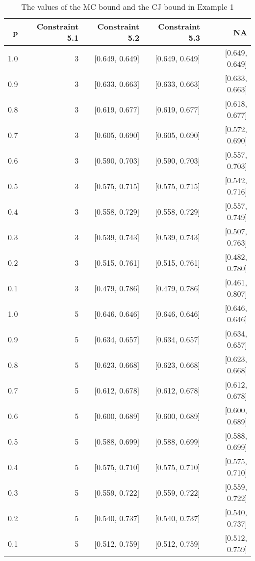 \begin{table}

\caption{\label{tab:tab1}The values of the MC bound and the CJ bound in Example 1}
\centering
\begin{tabular}[t]{rrrrr}
\toprule
p & Constraint 5.1 & Constraint 5.2 & Constraint 5.3 & NA\\
\midrule
1.0 & 3 & {}[0.649, 0.649] & {}[0.649, 0.649] & {}[0.649, 0.649]\\
\hline
0.9 & 3 & {}[0.633, 0.663] & {}[0.633, 0.663] & {}[0.633, 0.663]\\
\hline
0.8 & 3 & {}[0.619, 0.677] & {}[0.619, 0.677] & {}[0.618, 0.677]\\
\hline
0.7 & 3 & {}[0.605, 0.690] & {}[0.605, 0.690] & {}[0.572, 0.690]\\
\hline
0.6 & 3 & {}[0.590, 0.703] & {}[0.590, 0.703] & {}[0.557, 0.703]\\
\hline
0.5 & 3 & {}[0.575, 0.715] & {}[0.575, 0.715] & {}[0.542, 0.716]\\
\hline
0.4 & 3 & {}[0.558, 0.729] & {}[0.558, 0.729] & {}[0.557, 0.749]\\
\hline
0.3 & 3 & {}[0.539, 0.743] & {}[0.539, 0.743] & {}[0.507, 0.763]\\
\hline
0.2 & 3 & {}[0.515, 0.761] & {}[0.515, 0.761] & {}[0.482, 0.780]\\
\hline
0.1 & 3 & {}[0.479, 0.786] & {}[0.479, 0.786] & {}[0.461, 0.807]\\
\hline
1.0 & 5 & {}[0.646, 0.646] & {}[0.646, 0.646] & {}[0.646, 0.646]\\
\hline
0.9 & 5 & {}[0.634, 0.657] & {}[0.634, 0.657] & {}[0.634, 0.657]\\
\hline
0.8 & 5 & {}[0.623, 0.668] & {}[0.623, 0.668] & {}[0.623, 0.668]\\
\hline
0.7 & 5 & {}[0.612, 0.678] & {}[0.612, 0.678] & {}[0.612, 0.678]\\
\hline
0.6 & 5 & {}[0.600, 0.689] & {}[0.600, 0.689] & {}[0.600, 0.689]\\
\hline
0.5 & 5 & {}[0.588, 0.699] & {}[0.588, 0.699] & {}[0.588, 0.699]\\
\hline
0.4 & 5 & {}[0.575, 0.710] & {}[0.575, 0.710] & {}[0.575, 0.710]\\
\hline
0.3 & 5 & {}[0.559, 0.722] & {}[0.559, 0.722] & {}[0.559, 0.722]\\
\hline
0.2 & 5 & {}[0.540, 0.737] & {}[0.540, 0.737] & {}[0.540, 0.737]\\
\hline
0.1 & 5 & {}[0.512, 0.759] & {}[0.512, 0.759] & {}[0.512, 0.759]\\
\bottomrule
\end{tabular}
\end{table}
